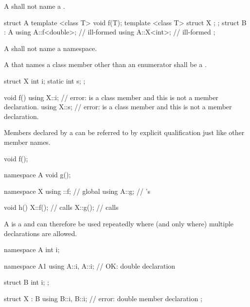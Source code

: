 \pnum
A  shall not name a .
\begin{example}
\begin{codeblock}
struct A {
  template <class T> void f(T);
  template <class T> struct X { };
};
struct B : A {
  using A::f<double>;           // ill-formed
  using A::X<int>;              // ill-formed
};
\end{codeblock}
\end{example}

\pnum
A  shall not name a namespace.

\pnum
A  that names a class member
other than an enumerator
shall be a
.
\begin{example}
\begin{codeblock}
struct X {
  int i;
  static int s;
};

void f() {
  using X::i;                   // error:  is a class member and this is not a member declaration.
  using X::s;                   // error:  is a class member and this is not a member declaration.
}
\end{codeblock}
\end{example}

\pnum
Members declared by a  can be referred to by
explicit qualification just like other member
names.
\begin{example}
\begin{codeblock}
void f();

namespace A {
  void g();
}

namespace X {
  using ::f;                    // global 
  using A::g;                   // 's 
}

void h()
{
  X::f();                       // calls 
  X::g();                       // calls 
}
\end{codeblock}
\end{example}

\pnum
A  is a  and can
therefore be used repeatedly where (and only where) multiple
declarations are allowed.
\begin{example}
\begin{codeblock}
namespace A {
  int i;
}

namespace A1 {
  using A::i, A::i;             // OK: double declaration
}

struct B {
  int i;
};

struct X : B {
  using B::i, B::i;             // error: double member declaration
};
\end{codeblock}
\end{example}

